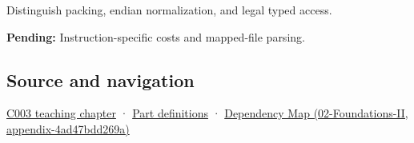 Distinguish packing, endian normalization, and legal typed access.

\textbf{Pending:} Instruction-specific costs and mapped-file parsing.

\subsection{Source and navigation}\label{appendix-0682dbfc5f0e-source-and-navigation}

\hyperref[01-foundations-i-ch002-where-the-bytes-live]{C003 teaching chapter} · \hyperref[appendix-fd090d982a15-m003---parts-41-60]{Part definitions} · \href{../02-Foundations-II/main.pdf\#nameddest=appendix-4ad47bdd269a}{Dependency Map (02-Foundations-II, appendix-4ad47bdd269a)}
